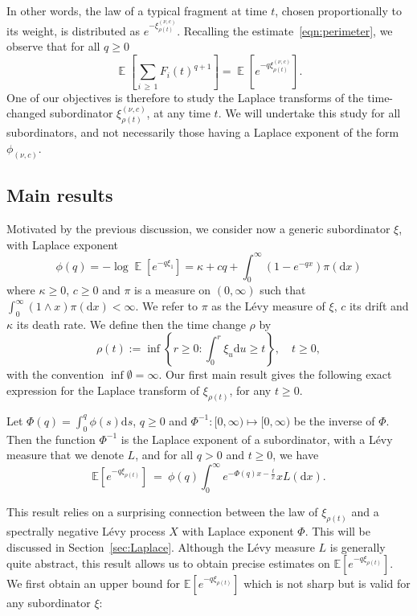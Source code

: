 \documentclass[AHL,Unicode,longabstracts,published]{cedram}
\newcommand{\bbE}{\mathbb{E}}
\DeclareMathOperator{\E}{\mathbb{E}}
\newcommand{\dd}{\mathrm{d}}
\begin{document}
In other words, the law of a typical fragment at time $t$, chosen proportionally to its weight, is distributed as $e^{-\xi^{(\nu,c)}_{\rho(t)}}$. Recalling the estimate~\eqref{eqn:perimeter}, we observe that for all $q \geq 0$
\begin{equation}\label{eq:Laplace_sum}
\E\left[\sum_{i\,\geq\,1} F_i(t)^{q+1}\right] = \E\left[e^{-q \xi^{(\nu,c)}_{\rho(t)}} \right].
\end{equation}
One of our objectives is therefore to study the Laplace transforms of the time-changed subordinator $\xi^{(\nu,c)}_{\rho(t)}$, at any time $t$. We will undertake this study for all subordinators, and not necessarily those having a Laplace exponent of the form $\phi_{(\nu,c)}$.


\subsection{Main results}\label{sec:def_fragmentations}

Motivated by the previous discussion, we consider now a generic subordinator $\xi$, with Laplace exponent
\[
\phi(q)=-\log \E\left[e^{-q \xi_1}\right] = \kappa + c q + \int_0^\infty (1 - e^{-qx}) \pi(\dd x)
\]
where $\kappa \geq 0$, $c \geq 0$ and $\pi$ is a measure on $(0,\infty)$ such that $\int_0^{\infty} (1 \wedge x) \pi(\dd x) < \infty$. We refer to $\pi$ as the Lévy measure of $\xi$, $c$ its drift and $\kappa$ its death rate. We define then the time change $\rho$ by
\[
\rho(t) := \inf \left\{ r \geq 0 : \int_0^r \xi_u \dd u \geq t \right\}, \quad t \geq 0,
\]
with the convention $\inf{\emptyset}=\infty$. Our first main result gives the following exact expression for the Laplace transform of $\xi_{\rho(t)}$, for any $t\geq 0$.


\begin{theo}\label{thm:lapTransform}
Let $\Phi(q)=\int_0^q \phi(s) \dd s$, $q \geq 0$ and $\Phi^{-1}: [0,\infty) \mapsto [0,\infty)$ be the inverse of $\Phi$. Then the function $\Phi^{-1}$ is the Laplace exponent of a subordinator, with a Lévy measure that we denote $L$, and for all $q > 0$ and $t \geq 0$, we have
\begin{equation}\label{eq:Laplace_intro}
\bbE\left[e^{-q\xi_{\rho(t)}}\right]~=~\phi(q)\int_0^{\infty} e^{-\Phi(q)x-\frac{t}{x}} xL(\dd x).
\end{equation}
\end{theo}


This result relies on a surprising connection between the law of $\xi_{\rho(t)}$ and a spectrally negative Lévy process $X$ with Laplace exponent $\Phi$. This will be discussed in Section~\ref{sec:Laplace}. Although the Lévy measure $L$ is generally quite abstract, this result allows us to obtain precise estimates on $ \bbE[e^{-q\xi_{\rho(t)}}]$. We first obtain an upper bound for $ \bbE[e^{-q\xi_{\rho(t)}}]$ which is not sharp but is valid for any subordinator $\xi$:
\end{document}
